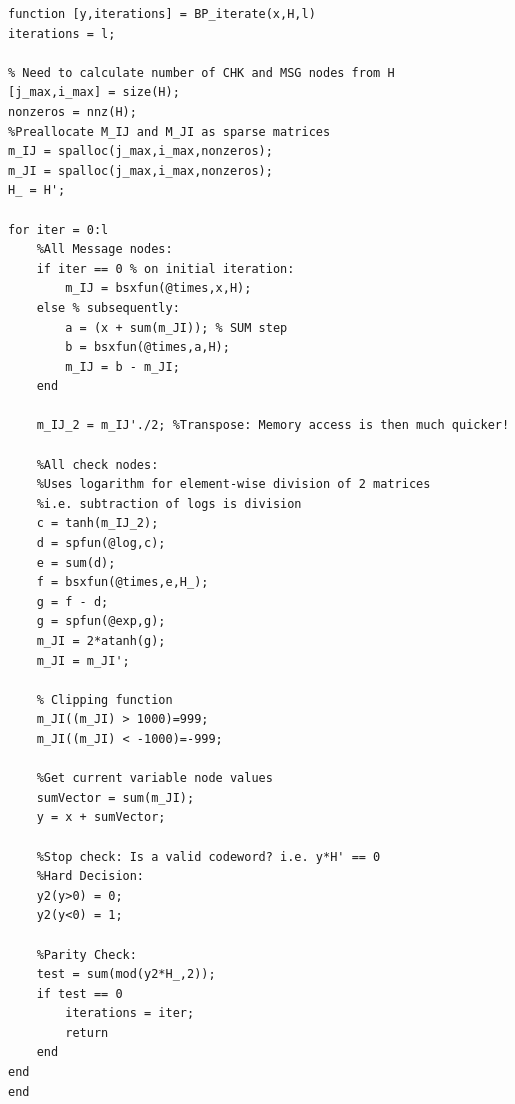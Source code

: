 \documentclass[11pt]{article}
\numberwithin{equation}{subsection}
\begin{document}
\begin{lstlisting}[style=Matlab-editor,caption = {Sum-Product decoder, second version (Vectorised)},label=code:sp2]
function [y,iterations] = BP_iterate(x,H,l)
iterations = l;

% Need to calculate number of CHK and MSG nodes from H
[j_max,i_max] = size(H);
nonzeros = nnz(H);
%Preallocate M_IJ and M_JI as sparse matrices
m_IJ = spalloc(j_max,i_max,nonzeros);
m_JI = spalloc(j_max,i_max,nonzeros);
H_ = H';

for iter = 0:l
    %All Message nodes:
    if iter == 0 % on initial iteration:
        m_IJ = bsxfun(@times,x,H);
    else % subsequently:
        a = (x + sum(m_JI)); % SUM step
        b = bsxfun(@times,a,H);
        m_IJ = b - m_JI;
    end
    
    m_IJ_2 = m_IJ'./2; %Transpose: Memory access is then much quicker!
    
    %All check nodes:
    %Uses logarithm for element-wise division of 2 matrices
    %i.e. subtraction of logs is division
    c = tanh(m_IJ_2);
    d = spfun(@log,c);
    e = sum(d);
    f = bsxfun(@times,e,H_);
    g = f - d;
    g = spfun(@exp,g);
    m_JI = 2*atanh(g);
    m_JI = m_JI';

    % Clipping function
    m_JI((m_JI) > 1000)=999;
    m_JI((m_JI) < -1000)=-999;
    
    %Get current variable node values
    sumVector = sum(m_JI);
    y = x + sumVector;
    
    %Stop check: Is a valid codeword? i.e. y*H' == 0
    %Hard Decision:
    y2(y>0) = 0;
    y2(y<0) = 1;
    
    %Parity Check:
    test = sum(mod(y2*H_,2));
    if test == 0
        iterations = iter;
        return
    end
end
end
\end{lstlisting}
\end{document}

